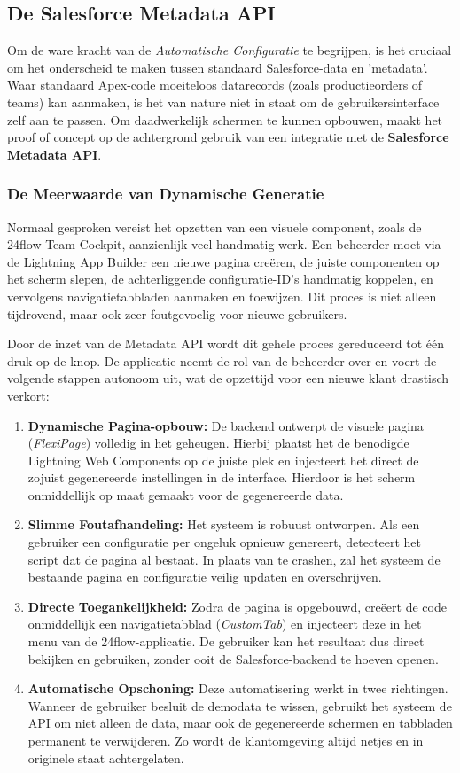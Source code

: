 \subsection{De Salesforce Metadata API}
Om de ware kracht van de \textit{Automatische Configuratie} te begrijpen, is het cruciaal om het onderscheid te maken tussen standaard Salesforce-data en 'metadata'. Waar standaard Apex-code moeiteloos datarecords (zoals productieorders of teams) kan aanmaken, is het van nature niet in staat om de gebruikersinterface zelf aan te passen. Om daadwerkelijk schermen te kunnen opbouwen, maakt het proof of concept op de achtergrond gebruik van een integratie met de \textbf{Salesforce Metadata API}.

\subsubsection{De Meerwaarde van Dynamische Generatie}
Normaal gesproken vereist het opzetten van een visuele component, zoals de 24flow Team Cockpit, aanzienlijk veel handmatig werk. Een beheerder moet via de Lightning App Builder een nieuwe pagina creëren, de juiste componenten op het scherm slepen, de achterliggende configuratie-ID's handmatig koppelen, en vervolgens navigatietabbladen aanmaken en toewijzen. Dit proces is niet alleen tijdrovend, maar ook zeer foutgevoelig voor nieuwe gebruikers.

Door de inzet van de Metadata API wordt dit gehele proces gereduceerd tot één druk op de knop. De applicatie neemt de rol van de beheerder over en voert de volgende stappen autonoom uit, wat de opzettijd voor een nieuwe klant drastisch verkort:

\begin{enumerate}
	\item \textbf{Dynamische Pagina-opbouw:} De backend ontwerpt de visuele pagina (\textit{FlexiPage}) volledig in het geheugen. Hierbij plaatst het de benodigde Lightning Web Components op de juiste plek en injecteert het direct de zojuist gegenereerde instellingen in de interface. Hierdoor is het scherm onmiddellijk op maat gemaakt voor de gegenereerde data.
	\item \textbf{Slimme Foutafhandeling:} Het systeem is robuust ontworpen. Als een gebruiker een configuratie per ongeluk opnieuw genereert, detecteert het script dat de pagina al bestaat. In plaats van te crashen, zal het systeem de bestaande pagina en configuratie veilig updaten en overschrijven.
	\item \textbf{Directe Toegankelijkheid:} Zodra de pagina is opgebouwd, creëert de code onmiddellijk een navigatietabblad (\textit{CustomTab}) en injecteert deze in het menu van de 24flow-applicatie. De gebruiker kan het resultaat dus direct bekijken en gebruiken, zonder ooit de Salesforce-backend te hoeven openen.
	\item \textbf{Automatische Opschoning:} Deze automatisering werkt in twee richtingen. Wanneer de gebruiker besluit de demodata te wissen, gebruikt het systeem de API om niet alleen de data, maar ook de gegenereerde schermen en tabbladen permanent te verwijderen. Zo wordt de klantomgeving altijd netjes en in originele staat achtergelaten.
\end{enumerate}